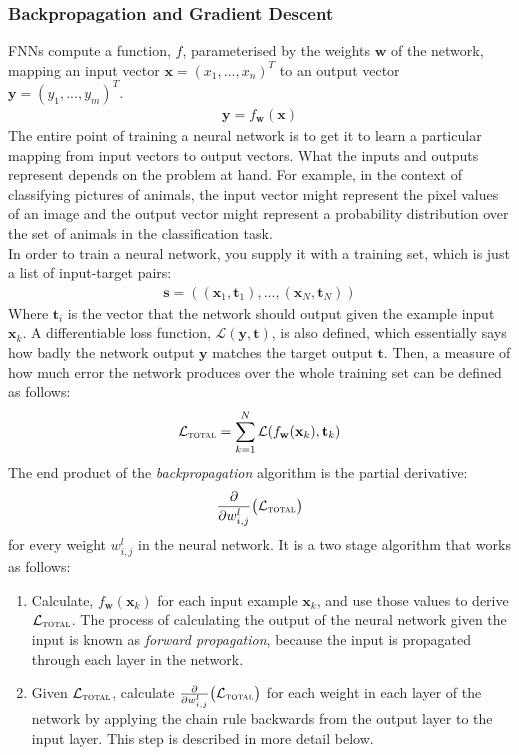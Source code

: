 \documentclass[a4paper, 12pt]{report}
\newcommand{\tit}[1]{\textit{#1}}
\begin{document}
\subsubsection{Backpropagation and Gradient Descent}

FNNs compute a function, $f$, parameterised by the weights $\mathbf{w}$ of the network, mapping an input vector $\mathbf{x} = (x_1, ..., x_n)^T$ to an output vector $\mathbf{y} = (y_1, ..., y_m)^T$. 
\begin{gather*}
	\mathbf{y} = f_\mathbf{w}(\mathbf{x})
\end{gather*}
The entire point of training a neural network is to get it to learn a particular mapping from input vectors to output vectors. What the inputs and outputs represent depends on the problem at hand. For example, in the context of classifying pictures of animals, the input vector might represent the pixel values of an image and the output vector might represent a probability distribution over the set of animals in the classification task. \\

In order to train a neural network, you supply it with a training set, which is just a list of input-target pairs:
\begin{gather*}
	\mathbf{s} = ((\mathbf{x}_1, \mathbf{t}_1), ..., (\mathbf{x}_N, \mathbf{t}_N))
\end{gather*}
Where $\mathbf{t}_i$ is the vector that the network should output given the example input $\mathbf{x}_k$. A differentiable loss function, $\mathcal{L}(\mathbf{y}, \mathbf{t})$, is also defined, which essentially says how badly the network output $\mathbf{y}$ matches the target output $\mathbf{t}$. Then, a measure of how much error the network produces over the whole training set can be defined as follows:
\begin{gather*}
	\mathcal{L}_{\text{\scshape total}} = \sum_{k = 1}^N \mathcal{L}(f_{\mathbf{w}}(\mathbf{x}_k), \mathbf{t}_k)
\end{gather*}
The end product of the \tit{backpropagation} algorithm is the partial derivative:
\begin{gather*}
	\frac{\partial}{\partial w_{i,j}^l} \big( \mathcal{L}_{\text{\scshape total}} \big)
\end{gather*}
for every weight $w_{i,j}^l$ in the neural network. It is a two stage algorithm that works as follows:
\begin{enumerate}
\item
	Calculate, $f_{\mathbf{w}}(\mathbf{x}_k)$ for each input example $\mathbf{x}_k$, and use those values to derive $\mathcal{L}_{\text{\scshape total}}$. The process of calculating the output of the neural network given the input is known as \tit{forward propagation}, because the input is propagated through each layer in the network.
\item
	Given $\mathcal{L}_{\text{\scshape total}}$, calculate $\frac{\partial}{\partial w_{i,j}^l} \big( \mathcal{L}_{\text{\scshape total}} \big)$ for each weight in each layer of the network by applying the chain rule backwards from the output layer to the input layer. This step is described in more detail below.
\end{enumerate}
\end{document}
